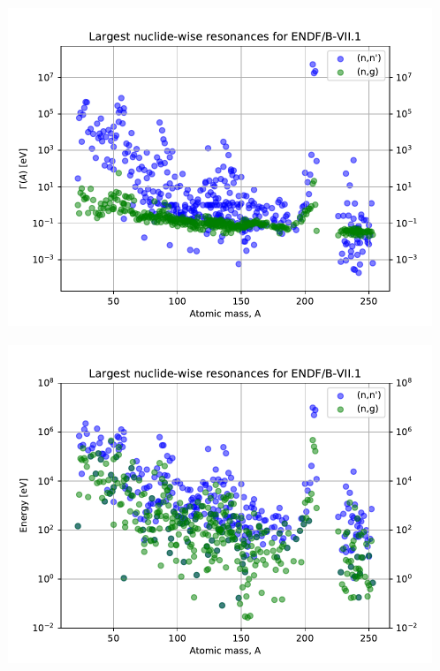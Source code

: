 
\begin{figure}[H]
  \centering
  \includegraphics[width=\linewidth]{largest_res_width_scatter}
  \caption{}
  \label{fig:}
\end{figure}

\begin{figure}[H]
  \centering
  \includegraphics[width=\linewidth]{largest_res_energy_scatter}
  \caption{}
  \label{fig:}
\end{figure}

